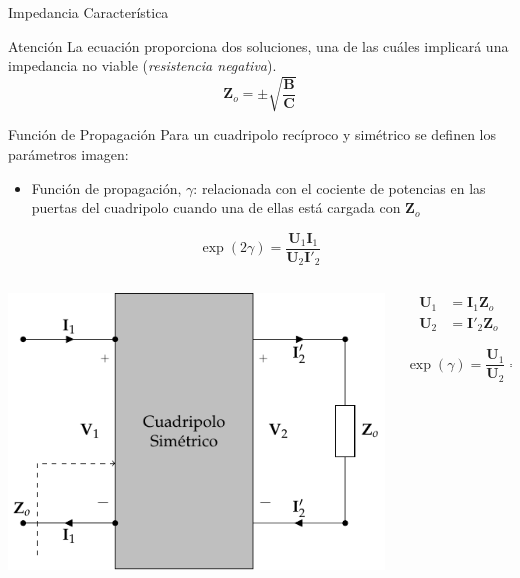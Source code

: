 \documentclass[xcolor={usenames,svgnames,dvipsnames}]{beamer}
\begin{document}
\begin{frame}[label={sec:orge0f8e2f}]{Impedancia Característica}
\begin{block}{Atención}
La ecuación proporciona dos soluciones, una de las cuáles implicará una impedancia no viable (\emph{resistencia negativa}).
\[
\boxed{\mathbf{Z}_o = \pm \sqrt{\frac{\mathbf{B}}{\mathbf{C}}}}
\]
\end{block}
\end{frame}

\begin{frame}[label={sec:orgc027250}]{Función de Propagación}
Para un cuadripolo \alert{recíproco} y \alert{simétrico} se definen los parámetros imagen:

\begin{itemize}
\item \alert{Función de propagación}, \(\gamma\): relacionada con el cociente de potencias en las puertas del cuadripolo cuando una de ellas está cargada con \(\mathbf{Z}_o\)
\end{itemize}

\[
  \exp(2\gamma) = \frac{\mathbf{U}_1\mathbf{I}_1}{\mathbf{U}_2\mathbf{I}'_2}
\]

\begin{columns}
\begin{column}{0.6\columnwidth}
\begin{center}
\includegraphics[width=.9\linewidth]{figs/cuadripolo_impedancia_caracteristica.pdf}
\end{center}
\end{column}

\begin{column}{0.4\columnwidth}
\begin{align*}
  \mathbf{U}_1 &= \mathbf{I}_1 \mathbf{Z}_o\\
  \mathbf{U}_2 &= \mathbf{I}'_2 \mathbf{Z}_o
\end{align*}

\[
  \boxed{\exp(\gamma) = \frac{\mathbf{U}_1}{\mathbf{U}_2} = \frac{\mathbf{I}_1}{\mathbf{I}'_2}}
\]
\end{column}
\end{columns}
\end{frame}
\end{document}
